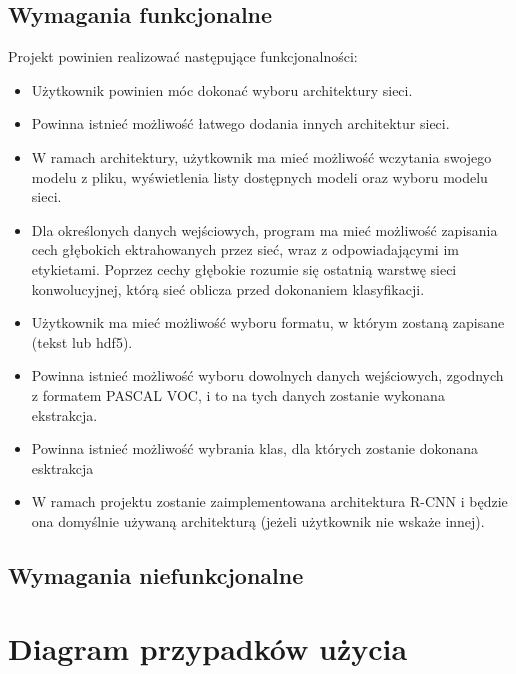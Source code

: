 \documentclass[a4paper,twoside,12pt]{book}
\begin{document}
{{\subsection{Wymagania funkcjonalne}
{Projekt powinien realizować następujące funkcjonalności:
\begin{itemize}
\item{Użytkownik powinien móc dokonać wyboru architektury sieci.}
 \item {Powinna istnieć możliwość łatwego dodania innych architektur sieci.}
 \item{W ramach architektury, użytkownik ma mieć możliwość wczytania swojego modelu z pliku, wyświetlenia listy dostępnych modeli oraz wyboru modelu sieci.}
  \item {Dla określonych danych wejściowych, program ma mieć możliwość zapisania cech głębokich ektrahowanych przez sieć, wraz z odpowiadającymi im etykietami. Poprzez cechy głębokie rozumie się ostatnią warstwę sieci konwolucyjnej, którą sieć oblicza przed dokonaniem klasyfikacji. }
  \item{Użytkownik ma mieć możliwość wyboru formatu, w którym zostaną zapisane (tekst lub hdf5).}
  \item{Powinna istnieć możliwość wyboru dowolnych danych wejściowych, zgodnych z formatem PASCAL VOC, i to na tych danych zostanie wykonana ekstrakcja.}
  \item{Powinna istnieć możliwość wybrania klas, dla których zostanie dokonana esktrakcja}
  \item{W ramach projektu zostanie zaimplementowana architektura R-CNN i będzie ona domyślnie używaną architekturą (jeżeli użytkownik nie wskaże innej).}
\end{itemize}}
\subsection{Wymagania niefunkcjonalne}
{}
\section{Diagram przypadków użycia}
{
\begin{figure}[h!]


\end{figure}}}}
\end{document}
